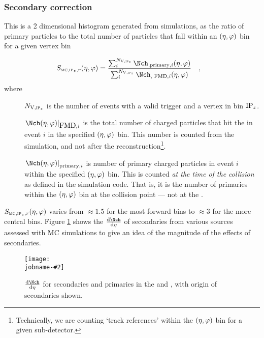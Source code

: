 \documentclass[compat,11pt]{alicenote}
\newcommand\mult[1][]{\Nch\ifx|#1|\relax\else_{#1}\fi}
\newcommand*{\etaphi}{\ensuremath(\eta,\varphi)}
\newcommand{\N}[2]{{\ensuremath N_{#1#2}}}
\newcommand{\NV}[1][]{\N{\text{V}}{#1}}
\newcommand*\SecMap{\ensuremath S_{\subMC,\subIPz,r}\etaphi}
\newcommand{\dndetadphi}[1][]{{\ensuremath%
    \ifx|#1|\else\left.\fi%
      \Nch\etaphi%
      \ifx|#1|\else\right|_{#1}\fi}}
\newcommand\figinput[2][\textwidth]{%
  \texttt{[image: \\jobname-\#2]}}
\begin{document}
\subsubsection{Secondary correction}
\label{sec:sub:sub:secmap}
This is a 2 dimensional histogram generated from simulations, as the
ratio of primary particles to the total number of particles that fall
within an $\etaphi$ bin for a given vertex bin

\begin{align}
  \label{eq:secondary}
  \SecMap{} &=
  \frac{\sum_i^{\NV[,\subIPz]}\mult[,\text{primary},i]\etaphi}{
    \sum_i^{\NV[,\subIPz]}\mult[,\text{\FMD{}},i]\etaphi}\quad,
\end{align}
where 
\begin{description}
\item[] $\NV[,\subIPz]$ is the number of events with a valid trigger
  and a vertex in bin $\IPz$.
\item[] $\dndetadphi[\FMD{},i]$ is the total number of charged
  particles that hit the \FMD{} in event $i$ in the specified
  $\etaphi$ bin.  This number is counted from the simulation, and not
  after the reconstruction\footnote{Technically, we are counting
    `track references' within the $\etaphi$ bin for a given
    sub-detector.}.
\item[] $\dndetadphi[\text{primary},i]$ is number of primary charged
  particles in event $i$ within the specified $\etaphi$ bin.  This is
  counted \emph{at the time of the collision} as defined in the
  simulation code.  That is, it is the number of primaries within the
  $\etaphi$ bin at the collision point --- not at the \FMD{}.
\end{description}

$\SecMap$ varies from $\approx 1.5$ for the most forward bins to
$\approx 3$ for the more central bins. Figure \ref{secondaries} shows
the $\dndeta$ of secondaries from various sources assessed with MC
simulations to give an idea of the magnitude of the effects of
secondaries.

\begin{figure}[]
  \centering
  \figinput[.9\textwidth]{secondary_origin}
  \caption{$\dndeta$ for secondaries and primaries in the \FMD{} and
    \SPD{}, with origin of secondaries shown.}
  \label{secondaries}
\end{figure} 
 
\end{document}
